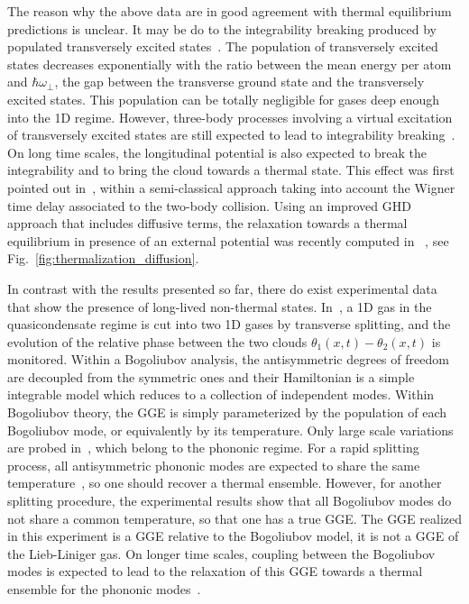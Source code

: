 \documentclass[onecolumn,amsfonts,showpacs,superscriptaddress]{revtex4-1}
\begin{document}
The reason why the above data are in good agreement with thermal equilibrium
predictions is unclear. It may be do to the integrability breaking produced by  populated
transversely excited states~\citep{li_relaxation_2020,moller_extension_2021}.
The population of transversely excited states decreases exponentially with the 
ratio between the mean energy per atom and $\hbar \omega_\perp$, the gap between the transverse ground state and the transversely excited states. This population can be totally 
negligible for gases deep enough into the 1D regime.
However, three-body processes involving a virtual excitation of transversely excited states are still expected to lead to integrability breaking~\citep{mazets_breakdown_2008,mazets_dynamics_2011,tan_relaxation_2010}.
On long time scales, the longitudinal
potential is also expected to 
break the integrability and 
to bring the cloud towards a thermal state. This effect was first pointed out in~\citep{mazets_integrability_2011}, within a semi-classical approach taking into account the Wigner time delay associated to the two-body collision.  Using an improved GHD approach that includes diffusive terms, the relaxation towards a thermal equilibrium in presence of an external potential was recently computed in ~\citep{bastianello_thermalization_2020}, see Fig.~\ref{fig:thermalization_diffusion}.



In contrast with the results presented so far,
there do exist experimental data that show the presence of long-lived non-thermal states. %
In~\citep{langen_experimental_2015}, a 1D gas in the quasicondensate regime is cut into two 1D gases by transverse splitting, and the evolution of the relative phase between the two clouds $\theta_1(x,t)-\theta_2(x,t)$ is monitored. 
Within a Bogoliubov analysis, the antisymmetric degrees of freedom are decoupled from the symmetric ones and their Hamiltonian is a simple integrable model which reduces to a collection of independent modes. Within Bogoliubov theory, the GGE is simply parameterized by the population of each Bogoliubov mode, or equivalently by its temperature. 
Only large scale variations are probed 
in~\citep{langen_experimental_2015}, which belong to the phononic regime. For a rapid splitting process, all antisymmetric phononic modes are expected to share the same temperature~\citep{gring_relaxation_2012}, so one should recover a thermal ensemble. However, for another splitting procedure, the experimental results show that all 
Bogoliubov modes do not share a common temperature, so that one has a true GGE. 
The GGE realized in this experiment is a GGE relative to the Bogoliubov model, it is not a GGE of the Lieb-Liniger gas. 
On longer time scales, coupling between the Bogoliubov modes is expected to lead to the relaxation of this GGE towards a thermal ensemble for the phononic modes~\citep{mazets_dephasing_2009}.
\end{document}
